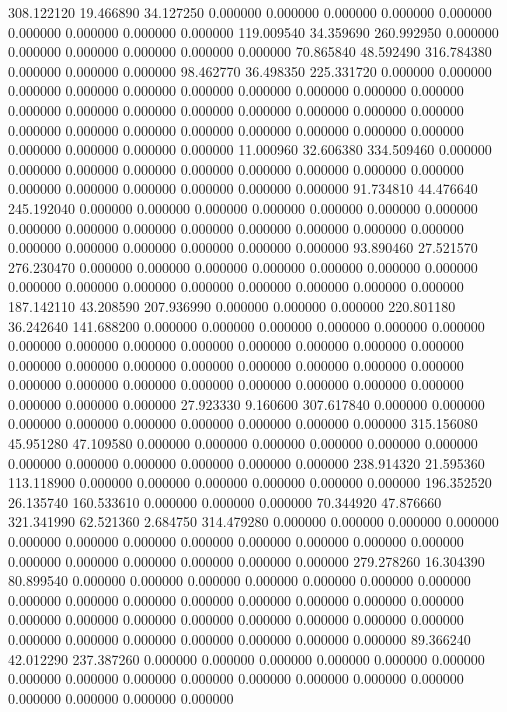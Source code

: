 308.122120 19.466890 34.127250
0.000000 0.000000 0.000000
0.000000 0.000000 0.000000
0.000000 0.000000 0.000000
119.009540 34.359690 260.992950
0.000000 0.000000 0.000000
0.000000 0.000000 0.000000
70.865840 48.592490 316.784380
0.000000 0.000000 0.000000
98.462770 36.498350 225.331720
0.000000 0.000000 0.000000
0.000000 0.000000 0.000000
0.000000 0.000000 0.000000
0.000000 0.000000 0.000000
0.000000 0.000000 0.000000
0.000000 0.000000 0.000000
0.000000 0.000000 0.000000
0.000000 0.000000 0.000000
0.000000 0.000000 0.000000
0.000000 0.000000 0.000000
11.000960 32.606380 334.509460
0.000000 0.000000 0.000000
0.000000 0.000000 0.000000
0.000000 0.000000 0.000000
0.000000 0.000000 0.000000
0.000000 0.000000 0.000000
91.734810 44.476640 245.192040
0.000000 0.000000 0.000000
0.000000 0.000000 0.000000
0.000000 0.000000 0.000000
0.000000 0.000000 0.000000
0.000000 0.000000 0.000000
0.000000 0.000000 0.000000
0.000000 0.000000 0.000000
93.890460 27.521570 276.230470
0.000000 0.000000 0.000000
0.000000 0.000000 0.000000
0.000000 0.000000 0.000000
0.000000 0.000000 0.000000
0.000000 0.000000 0.000000
187.142110 43.208590 207.936990
0.000000 0.000000 0.000000
220.801180 36.242640 141.688200
0.000000 0.000000 0.000000
0.000000 0.000000 0.000000
0.000000 0.000000 0.000000
0.000000 0.000000 0.000000
0.000000 0.000000 0.000000
0.000000 0.000000 0.000000
0.000000 0.000000 0.000000
0.000000 0.000000 0.000000
0.000000 0.000000 0.000000
0.000000 0.000000 0.000000
0.000000 0.000000 0.000000
27.923330 9.160600 307.617840
0.000000 0.000000 0.000000
0.000000 0.000000 0.000000
0.000000 0.000000 0.000000
315.156080 45.951280 47.109580
0.000000 0.000000 0.000000
0.000000 0.000000 0.000000
0.000000 0.000000 0.000000
0.000000 0.000000 0.000000
238.914320 21.595360 113.118900
0.000000 0.000000 0.000000
0.000000 0.000000 0.000000
196.352520 26.135740 160.533610
0.000000 0.000000 0.000000
70.344920 47.876660 321.341990
62.521360 2.684750 314.479280
0.000000 0.000000 0.000000
0.000000 0.000000 0.000000
0.000000 0.000000 0.000000
0.000000 0.000000 0.000000
0.000000 0.000000 0.000000
0.000000 0.000000 0.000000
279.278260 16.304390 80.899540
0.000000 0.000000 0.000000
0.000000 0.000000 0.000000
0.000000 0.000000 0.000000
0.000000 0.000000 0.000000
0.000000 0.000000 0.000000
0.000000 0.000000 0.000000
0.000000 0.000000 0.000000
0.000000 0.000000 0.000000
0.000000 0.000000 0.000000
0.000000 0.000000 0.000000
89.366240 42.012290 237.387260
0.000000 0.000000 0.000000
0.000000 0.000000 0.000000
0.000000 0.000000 0.000000
0.000000 0.000000 0.000000
0.000000 0.000000 0.000000
0.000000 0.000000 0.000000
